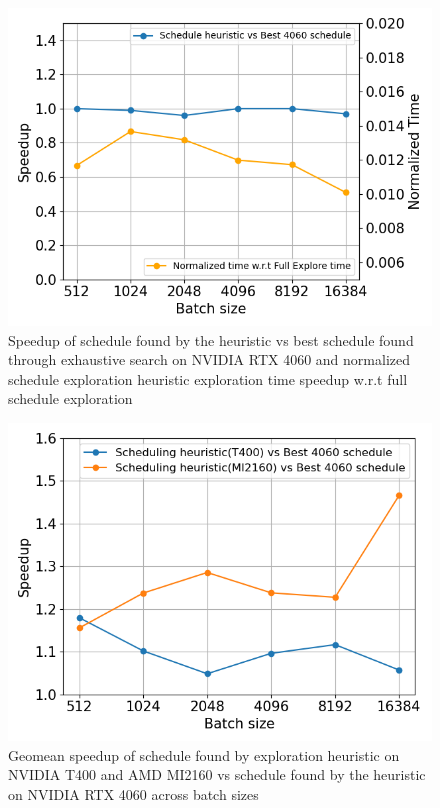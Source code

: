 \begin{figure}[htb]
  \centering
  \includegraphics[width=0.75\linewidth]{figures/speedup_vs_norm_time_line_graph_4060.png}
  \caption{Speedup of schedule found by the heuristic vs best schedule found through exhaustive search on NVIDIA RTX 4060 and 
  normalized schedule exploration heuristic exploration time speedup w.r.t full schedule exploration}
  \label{Fig:HeuristicVsFullExplore_Speedup}
\end{figure}

\begin{figure}[htb]
  \centering
  \includegraphics[width=0.75\linewidth]{figures/geomean_speedup_T400_4060_vs_T400_vs_MI2160.png}
  \caption{Geomean speedup of schedule found by exploration heuristic on NVIDIA T400 and AMD MI2160 vs 
  schedule found by the heuristic on NVIDIA RTX 4060 across batch sizes}
  \label{Fig:AutotuningSpeedupvs4060Sched}
\end{figure}

